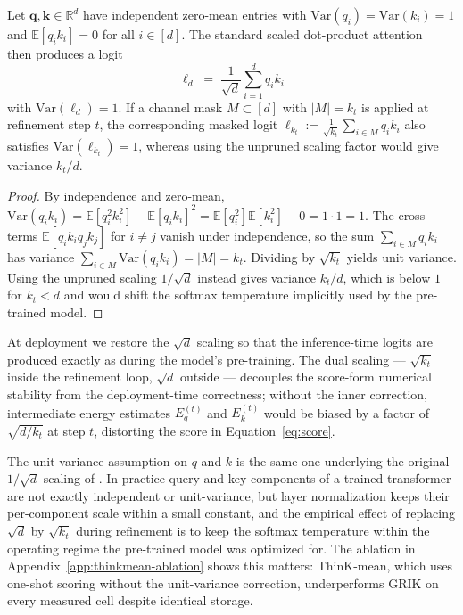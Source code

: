 \documentclass{article}
\begin{document}
\begin{proposition}
\label{prop:variance}
Let $\mathbf{q}, \mathbf{k} \in \mathbb{R}^d$ have independent zero-mean entries with $\mathrm{Var}(q_i) = \mathrm{Var}(k_i) = 1$ and $\mathbb{E}[q_i k_i] = 0$ for all $i \in [d]$. The standard scaled dot-product attention~\citep{vaswani2017} then produces a logit
\begin{equation}
\ell_d \;=\; \frac{1}{\sqrt{d}} \sum_{i=1}^{d} q_i k_i
\end{equation}
with $\mathrm{Var}(\ell_d) = 1$. If a channel mask $M \subset [d]$ with $|M| = k_t$ is applied at refinement step $t$, the corresponding masked logit $\ell_{k_t} := \frac{1}{\sqrt{k_t}} \sum_{i \in M} q_i k_i$ also satisfies $\mathrm{Var}(\ell_{k_t}) = 1$, whereas using the unpruned scaling factor would give variance $k_t / d$.
\end{proposition}
 
\begin{proof}
By independence and zero-mean, $\mathrm{Var}(q_i k_i) = \mathbb{E}[q_i^2 k_i^2] - \mathbb{E}[q_i k_i]^2 = \mathbb{E}[q_i^2] \mathbb{E}[k_i^2] - 0 = 1 \cdot 1 = 1$. The cross terms $\mathbb{E}[q_i k_i q_j k_j]$ for $i \neq j$ vanish under independence, so the sum $\sum_{i \in M} q_i k_i$ has variance $\sum_{i \in M} \mathrm{Var}(q_i k_i) = |M| = k_t$. Dividing by $\sqrt{k_t}$ yields unit variance. Using the unpruned scaling $1/\sqrt{d}$ instead gives variance $k_t / d$, which is below $1$ for $k_t < d$ and would shift the softmax temperature implicitly used by the pre-trained model.
\end{proof}
 
\begin{remark}
At deployment we restore the $\sqrt{d}$ scaling so that the inference-time logits are produced exactly as during the model's pre-training. The dual scaling --- $\sqrt{k_t}$ inside the refinement loop, $\sqrt{d}$ outside --- decouples the score-form numerical stability from the deployment-time correctness; without the inner correction, intermediate energy estimates $E_q^{(t)}$ and $E_k^{(t)}$ would be biased by a factor of $\sqrt{d/k_t}$ at step $t$, distorting the score in Equation~\ref{eq:score}.
\end{remark}
 
\begin{remark}
The unit-variance assumption on $q$ and $k$ is the same one underlying the original $1/\sqrt{d}$ scaling of \citet{vaswani2017}. In practice query and key components of a trained transformer are not exactly independent or unit-variance, but layer normalization keeps their per-component scale within a small constant, and the empirical effect of replacing $\sqrt{d}$ by $\sqrt{k_t}$ during refinement is to keep the softmax temperature within the operating regime the pre-trained model was optimized for. The ablation in Appendix~\ref{app:thinkmean-ablation} shows this matters: ThinK-mean, which uses one-shot scoring without the unit-variance correction, underperforms GRIK on every measured cell despite identical storage.
\end{remark}
 
\end{document}
